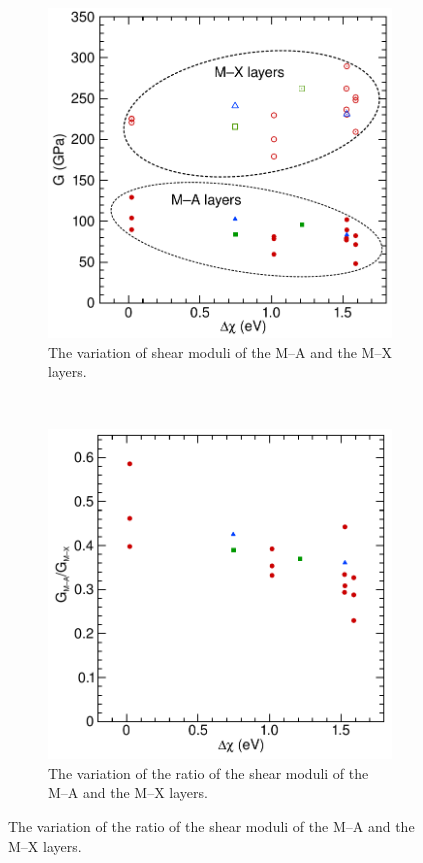 \begin{figure}
\begin{subfigure}{0.4\textwidth}
\centering
{}
\includegraphics[width=\textwidth]{Gmx_and_Gma_dX_MAX}
\caption{The variation of shear moduli of the M--A and the M--X layers.  \label{fig:Gma_variation}}
\end{subfigure}
~
\begin{subfigure}{0.4\textwidth}
\centering
{}
\includegraphics[width=\textwidth]{Gma_Gmx_vs_dX}
\caption{The variation of the ratio of the shear moduli of the M--A and the M--X layers. \label{fig:ratio_of_Gma_to_Gmx}}
\end{subfigure}


\end{figure}
